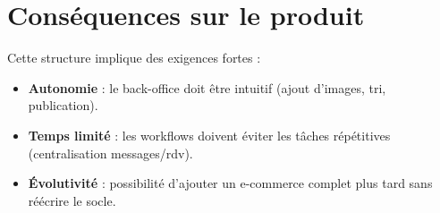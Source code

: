 \section{Conséquences sur le produit}
Cette structure implique des exigences fortes :
\begin{itemize}
    \item \textbf{Autonomie} : le back-office doit être intuitif (ajout d’images, tri, publication).
    \item \textbf{Temps limité} : les workflows doivent éviter les tâches répétitives (centralisation messages/rdv).
    \item \textbf{Évolutivité} : possibilité d’ajouter un e-commerce complet plus tard sans réécrire le socle.
\end{itemize}
